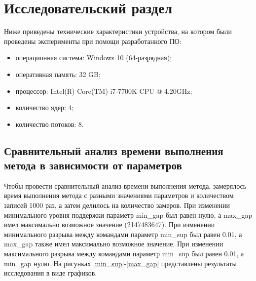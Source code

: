 \chapter{Исследовательский раздел}
\label{cha:research}

Ниже приведены технические характеристики устройства, на котором были проведены эксперименты при помощи разработанного ПО:
\begin{itemize}
	\item операционная система: Windows 10 (64-разрядная);
	\item оперативная память: 32 GB;
	\item процессор: Intel(R) Core(TM) i7-7700K CPU @ 4.20GHz;
	\item количество ядер: 4;
	\item количество потоков: 8.
\end{itemize}

\section{Сравнительный анализ времени выполнения метода в зависимости от параметров}

Чтобы провести сравнительный анализ времени выполнения  метода, замерялось время выполнения метода с разными значениями параметров и количеством записей 1000 раз, а затем делилось на количество замеров.
При изменении минимального уровня поддержки параметр min\_gap был равен нулю, а max\_gap имел максимально возможное значение (2147483647).
При изменении минимального разрыва между командами параметр min\_sup был равен 0.01, а max\_gap также имел максимально возможное значение.
При изменении максимального разрыва между командами параметр min\_sup был равен 0.01, а min\_gap нулю.
На рисунках \ref{min_sup}-\ref{max_gap} представлены результаты исследования в виде графиков.

